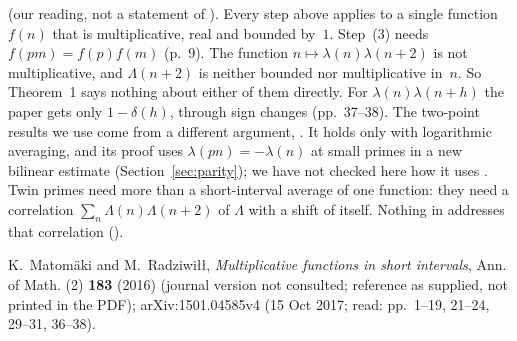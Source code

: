 \begin{remark}\label{rem:mr16-transfer}
 (our reading, not a statement of \cite{MR16}). Every step
above applies to a single function $f(n)$ that is multiplicative, real and
bounded by~$1$. Step~(3) needs $f(pm)=f(p)f(m)$ (p.~9). The function
$n\mapsto\lambda(n)\lambda(n+2)$ is not multiplicative, and
$\Lambda(n+2)$ is neither bounded nor multiplicative in~$n$. So
Theorem~1 says nothing about either of them directly. For
$\lambda(n)\lambda(n+h)$ the paper gets only $1-\delta(h)$, through sign
changes (pp.~37--38). The two-point results we use come from a different
argument, \cite[Theorem~1.2]{Tao16}. It holds only with logarithmic averaging,
and its proof uses $\lambda(pn)=-\lambda(n)$ at small primes in a new
bilinear estimate (Section~\ref{sec:parity}); we have not checked here how it
uses \cite{MR16}. Twin primes need more than a short-interval average of
one function: they need a correlation $\sum_n\Lambda(n)\Lambda(n+2)$ of
$\Lambda$ with a shift of itself. Nothing in \cite{MR16} addresses that
correlation ().
\end{remark}

 K.~Matom\"aki and M.~Radziwi\l\l, \emph{Multiplicative functions in short intervals}, Ann. of Math. (2) \textbf{183} (2016) (journal version not consulted; reference as supplied, not printed in the PDF); arXiv:1501.04585v4 (15 Oct 2017; read: pp.~1--19, 21--24, 29--31, 36--38).

